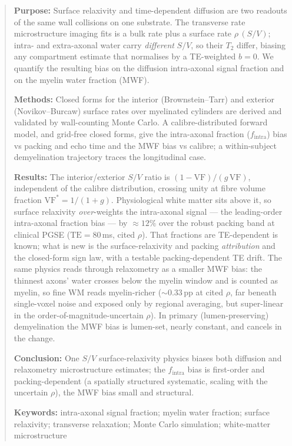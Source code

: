 \begin{abstract}
\noindent
\textbf{Purpose:} Surface relaxivity and time-dependent diffusion are two readouts
of the same wall collisions on one substrate. The transverse rate microstructure imaging
fits is a bulk rate plus a surface rate $\rho\,(S/V)$; intra- and extra-axonal water carry
\emph{different} $S/V$, so their $T_2$ differ, biasing any compartment estimate that
normalises by a TE-weighted $b=0$. We quantify the resulting bias on the diffusion
intra-axonal signal fraction and on the myelin water fraction (MWF).

\textbf{Methods:} Closed forms for the interior (Brownstein--Tarr) and exterior
(Novikov--Burcaw) surface rates over myelinated cylinders are derived and validated by
wall-counting Monte Carlo. A calibre-distributed forward model, and grid-free closed forms,
give the intra-axonal fraction ($f_{\mathrm{intra}}$) bias vs packing and echo time and the
MWF bias vs calibre; a within-subject demyelination trajectory traces the longitudinal case.

\textbf{Results:} The interior/exterior $S/V$ ratio is $(1-\mathrm{VF})/(g\,\mathrm{VF})$,
independent of the calibre distribution, crossing unity at fibre volume fraction
$\mathrm{VF}^{\ast}=1/(1+g)$. Physiological white matter sits above it, so surface relaxivity
\emph{over}-weights the intra-axonal signal --- the leading-order intra-axonal fraction bias ---
by ${\approx}12\%$ over the robust packing band at clinical PGSE ($\mathrm{TE}=80$\,ms,
cited $\rho$). That fractions are TE-dependent is known; what is new is the surface-relaxivity
and packing \emph{attribution} and the closed-form sign law, with a testable
packing-dependent TE drift. The same physics reads through relaxometry as a smaller MWF bias:
the thinnest axons' water crosses below the myelin window and is counted as myelin, so fine WM
reads myelin-richer (${\sim}0.33$\,pp at cited $\rho$, far beneath single-voxel noise and
exposed only by regional averaging, but super-linear in the order-of-magnitude-uncertain $\rho$). In primary (lumen-preserving)
demyelination the MWF bias is lumen-set, nearly constant, and cancels in the change.

\textbf{Conclusion:} One $S/V$ surface-relaxivity physics biases both diffusion and
relaxometry microstructure estimates; the $f_{\mathrm{intra}}$ bias is first-order and
packing-dependent (a spatially structured systematic, scaling with the uncertain $\rho$),
the MWF bias small and structural.

\vspace{1em}
\noindent\textbf{Keywords:} intra-axonal signal fraction; myelin water fraction; surface
relaxivity; transverse relaxation; Monte Carlo simulation; white-matter microstructure
\end{abstract}

